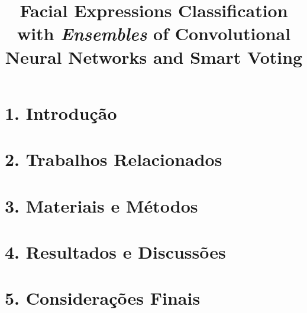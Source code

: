 \documentclass[12pt]{article}
\title{Facial Expressions Classification with \emph{Ensembles} of Convolutional Neural Networks and Smart Voting}
\begin{document}
\maketitle




\section{1. Introdução}


\section{2. Trabalhos Relacionados}


\section{3. Materiais e Métodos}


\section{4. Resultados e Discussões}


\section{5. Considerações Finais}




\end{document}

